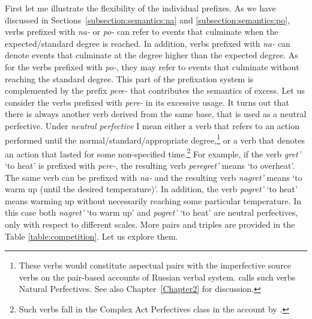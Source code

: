 First let me illustrate the flexibility of the individual prefixes. As we have discussed in Sections~\ref{subsection:semantics:na} and \ref{subsection:semantics:po}, verbs prefixed with \textit{na-} or \textit{po-} can refer to events that culminate when the expected/standard degree is reached. In addition, verbs prefixed with \textit{na-} can denote events that culminate at the degree higher than the expected degree. As for the verbs prefixed with \textit{po-}, they may refer to events that culminate without reaching the standard degree. This part of the prefixation system is complemented by the prefix \textit{pere-} that contributes the semantics of excess. Let us consider the verbs prefixed with \textit{pere-} in its excessive usage. It turns out that there is always another verb derived from the same base, that is used as a neutral perfective. Under \textit{neutral perfective} I mean either a verb that refers to an action performed until the normal/standard/appropriate degree,\footnote{These verbs would constitute aspectual pairs with the imperfective source verbs on the pair-based accounts of Russian verbal system. \citet{Janda:07a} calls such verbs Natural Perfectives. See also Chapter~\ref{Chapter2} for discussion.} or a verb that denotes an action that lasted for some non-specified time.\footnote{Such verbs fall in the Complex Act Perfectives class in the account by \citet{Janda:07a}.} For example, if the verb \textit{gret'} `to heat' is prefixed with \textit{pere-}, the resulting verb \textit{peregret'} means `to overheat'. The same verb can be prefixed with \textit{na-} and the resulting verb \textit{nagret'} means `to warm up (until the desired temperature)'. In addition, the verb \textit{pogret'} `to heat' means warming up without necessarily reaching some particular temperature. In this case both \textit{nagret'} `to warm up'  and \textit{pogret'} `to heat' are neutral perfectives, only with respect to different scales. More pairs and triples are provided in the Table \ref{table:competition}. Let us explore them. 

